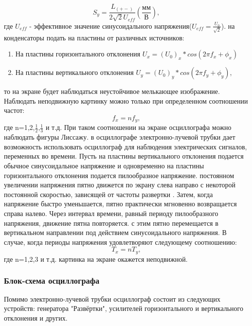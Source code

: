 \begin{equation}
\label{eq:2}
    S_{y}=\frac{L_{(+-)}}{2\sqrt{2}U_{eff} }(\frac{\text{мм}}{\text{В}}),
\end{equation}
где $U_{eff}$ - эффективное значение синусоидального напряжения($U_{eff}=\frac{U_0}{\sqrt{2}}$).
 на конденсаторы подать на пластины от различных источников:
\begin{enumerate}
    \item На пластины горизонтального отклонения  $U_x=(U_0)_x*cos(2\pi{}f_x+\phi_x)$
   \item На пластины вертикального отклонения $U_y=(U_0)_y*cos(2\pi{}f_y+\phi_y)$,
\end{enumerate}
то на экране будет наблюдаться неустойчивое мелькающее изображение. Наблюдать неподвижную картинку можно только при определенном соотношении частот:
\begin{equation}
    f_{x}=nf_{y},
\end{equation}
 где n=1,2,$ \frac{1}{2}$,$ \frac{1}{3}$ и т.д. При таком соотношении на экране осциллографа можно наблюдать фигуры Лиссажу.
  в осциллографе электронно-лучевой трубки дает возможность
использовать осциллограф для наблюдения электрических сигналов, переменных во
времени. Пусть на пластины вертикального отклонения подается обычное синусоидальное напряжение и одновременно на пластины горизонтального отклонения подается пилообразное напряжение.
 постоянном увеличении напряжения пятно движется по экрану слева направо с некоторой постоянной скоростью, зависящей от частоты развертки . Затем, когда напряжение быстро уменьшается, пятно практически мгновенно возвращается справа налево. Через интервал времени, равный периоду пилообразного напряжения, движение пятна повторяется.
 с этим пятно перемещается в вертикальном направлении под действием синусоидального напряжения. В случае, когда периоды напряжения удовлетворяют следующему соотношению: 
\begin{equation}
    T_{x}=nT_{y},
\end{equation}
где n=1,2,3 и т.д. картинка на экране окажется неподвижной.

\subsubsection{Блок-схема осциллографа}
Помимо электронно-лучевой трубки осциллограф состоит из следующих устройств: генератора "Развёртки", усилителей горизонтального и вертикального отклонения и других.



